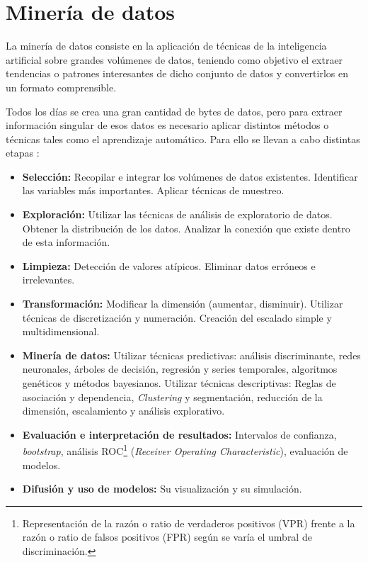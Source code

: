 
\section{Minería de datos}

La minería de datos consiste en la aplicación de técnicas de la inteligencia artificial sobre grandes volúmenes de datos, teniendo como objetivo el extraer tendencias o patrones interesantes de dicho conjunto de datos y convertirlos en un formato comprensible.

Todos los días se crea una gran cantidad de bytes de datos, pero para extraer información singular de esos datos es necesario aplicar distintos métodos o técnicas tales como el aprendizaje automático. Para ello se llevan a cabo distintas etapas \cite{MD:tecnicasyherramientas}:

\begin{itemize}
    \item \textbf{Selección:} Recopilar e integrar los volúmenes de datos existentes. Identificar las variables más importantes. Aplicar técnicas de muestreo.
    \item \textbf{Exploración:} Utilizar las técnicas de análisis de exploratorio de datos. Obtener la distribución de los datos. Analizar la conexión que existe dentro de esta información.
    \item \textbf{Limpieza:} Detección de valores atípicos. Eliminar datos erróneos e irrelevantes.
    \item \textbf{Transformación:} Modificar la dimensión (aumentar, disminuir). Utilizar técnicas de discretización y numeración. Creación del escalado simple y multidimensional.
    \item \textbf{Minería de datos:} Utilizar técnicas predictivas: análisis discriminante, redes neuronales, árboles de decisión, regresión y series temporales, algoritmos genéticos y métodos bayesianos. Utilizar técnicas descriptivas: Reglas de asociación y dependencia, \textit{Clustering} y segmentación, reducción de la dimensión, escalamiento y análisis explorativo.
    \item \textbf{Evaluación e interpretación de resultados:} Intervalos de confianza, \textit{bootstrap}, análisis ROC\footnote{ Representación de la razón o ratio de verdaderos positivos (VPR) frente a la razón o ratio de falsos positivos (FPR) según se varía el umbral de discriminación.} (\textit{Receiver Operating Characteristic}), evaluación de modelos.
    \item \textbf{Difusión y uso de modelos:} Su visualización y su simulación.
\end{itemize}


